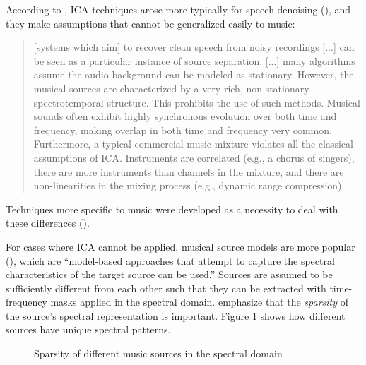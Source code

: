\documentclass[report.tex]{subfiles}
\begin{document}
According to \textcite{musicsepintro1}, ICA techniques arose more typically for speech denoising (\cite{speechsep}), and they make assumptions that cannot be generalized easily to music:

\begin{quote}
	[systems which aim] to recover clean speech from noisy recordings [...] can be seen as a particular instance of source separation. [...] many algorithms assume the audio background can be modeled as stationary. However, the musical sources are characterized by a very rich, non-stationary spectrotemporal structure. This prohibits the use of such methods. Musical sounds often exhibit highly synchronous evolution over both time and frequency, making overlap in both time and frequency very common. Furthermore, a typical commercial music mixture violates all the classical assumptions of ICA. Instruments are correlated (e.g., a chorus of singers), there are more instruments than channels in the mixture, and there are non-linearities in the mixing process (e.g., dynamic range compression).
\end{quote}

Techniques more specific to music were developed as a necessity to deal with these differences (\cite{musicseptechniques1, musicseptechniques2}).

For cases where ICA cannot be applied, musical source models are more popular (\cite{musicsepgood}), which are ``model-based approaches that attempt to capture the spectral characteristics of the target source can be used.'' Sources are assumed to be sufficiently different from each other such that they can be extracted with time-frequency masks applied in the spectral domain. \textcite{musicsepgood} emphasize that the \textit{sparsity} of the source's spectral representation is important. Figure \ref{fig:sepgood} shows how different sources have unique spectral patterns.

\begin{figure}[ht]
	\centering
	\caption{Sparsity of different music sources in the spectral domain}
\label{fig:sepgood}
\end{figure}
\end{document}
